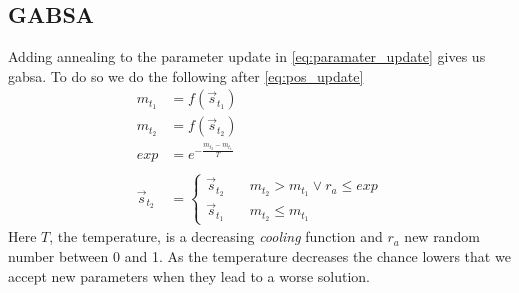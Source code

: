 \subsection{GABSA}
Adding annealing to the parameter update in \cref{eq:paramater_update} gives us \ac{gabsa}. To do so we do the following after \cref{eq:pos_update}
%
\begin{subequations}[resume]
\begin{align}
	m_{t_1} &= f(\vec{s}_{t_1}) \\
	m_{t_2} &= f(\vec{s}_{t_2}) \\
	exp &= e^{-\frac{m_{t_2}-m_{t_1}}{T}} \\
	\\
	\vec{s}_{t_2} &= \left\{
		\begin{array}{ll}
			\vec{s}_{t_2} & \quad m_{t_2} > m_{t_1} \lor r_a \leq exp\\ 
			\vec{s}_{t_1} & \quad m_{t_2} \leq m_{t_1}
		\end{array}
	\right.
\end{align}
\end{subequations}
%
Here $T$, the temperature, is a decreasing \textit{cooling} function and $r_a$ new random number between 0 and 1. As the temperature decreases the chance lowers that we accept new parameters when they lead to a worse solution.
